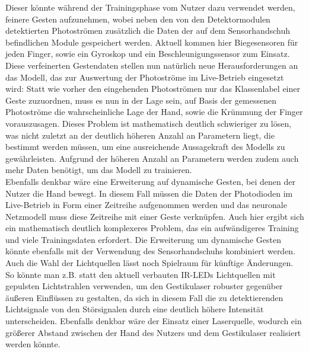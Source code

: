 Dieser könnte während der Trainingsphase vom Nutzer dazu verwendet werden, feinere Gesten aufzunehmen, wobei neben den von den Detektormodulen detektierten Photoströmen zusätzlich die Daten der auf dem Sensorhandschuh befindlichen Module gespeichert werden. Aktuell kommen hier Biegesensoren für jeden Finger, sowie ein Gyroskop und ein Beschleunigungssensor zum Einsatz. Diese verfeinerten Gestendaten stellen nun natürlich neue Herausforderungen an das Modell, das zur Auswertung der Photoströme im Live-Betrieb eingesetzt wird: Statt wie vorher den eingehenden Photoströmen nur das Klassenlabel einer Geste zuzuordnen, muss es nun in der Lage sein, auf Basis der gemessenen Photoströme die wahrscheinliche Lage der Hand, sowie die Krümmung der Finger vorauszusagen. Dieses Problem ist mathematisch deutlich schwieriger zu lösen, was nicht zuletzt an der deutlich höheren Anzahl an Parametern liegt, die bestimmt werden müssen, um eine ausreichende Aussagekraft des Modells zu gewährleisten. Aufgrund der höheren Anzahl an Parametern werden zudem auch mehr Daten benötigt, um das Modell zu trainieren. \\
Ebenfalls denkbar wäre eine Erweiterung auf dynamische Gesten, bei denen der Nutzer die Hand bewegt. In diesem Fall müssen die Daten der Photodioden im Live-Betrieb in Form einer Zeitreihe aufgenommen werden und das neuronale Netzmodell muss diese Zeitreihe mit einer Geste verknüpfen. Auch hier ergibt sich ein mathematisch deutlich komplexeres Problem, das ein aufwändigeres Training und viele Trainingsdaten erfordert. Die Erweiterung um dynamische Gesten könnte ebenfalls mit der Verwendung des Sensorhandschuhs kombiniert werden. \\
Auch die Wahl der Lichtquellen lässt noch Spielraum für künftige Änderungen. So könnte man z.B. statt den aktuell verbauten IR-LEDs Lichtquellen mit gepulsten Lichtstrahlen verwenden, um den Gestikulaser robuster gegenüber äußeren Einflüssen zu gestalten, da sich in diesem Fall die zu detektierenden Lichtsignale von den Störsignalen durch eine deutlich höhere Intensität unterscheiden. Ebenfalls denkbar wäre der Einsatz einer Laserquelle, wodurch ein größerer Abstand zwischen der Hand des Nutzers und dem Gestikulaser realisiert werden könnte.